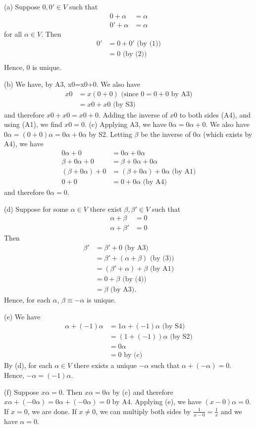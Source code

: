 \documentclass[12pt,letterpaper,reqno]{article}
\numberwithin{equation}{section}
\begin{document}
\begin{pf}
(a) Suppose $0,0' \in V$ such that 
\begin{align}
	0+\alpha &=\alpha \\
	0'+\alpha &=\alpha
\end{align}
for all $\alpha \in V$. Then 
\begin{align*}
	0'&=0+0' \text{ (by (1))} \\
	&=0 \text{ (by (2))} \\
\end{align*}
Hence, $0$ is unique. 

(b) We have, by A3, x0=x0+0. We also have
\begin{align*}
	x0&=x(0+0) \text{ (since $0=0+0$ by A3)} \\
	&=x0+x0 \text{ (by S3)}
\end{align*} and therefore $x0+x0=x0+0$. Adding the inverse of $x0$ to both sides (A4), and using (A1), we find $x0=0$.	
(c) Applying A3, we have $0\alpha=0\alpha+0$. We also have
$0\alpha =(0+0)\alpha=0\alpha + 0\alpha$ by S2. Letting $\beta$ be the inverse of $0\alpha$ (which exists by A4), we have
\begin{align*}
	0\alpha+0&=0\alpha+0\alpha \\
	\beta+0\alpha+0&=\beta+0\alpha+0\alpha \\
	(\beta+0\alpha)+0&=(\beta+0\alpha)+0\alpha \text{ (by A1)}\\
	0+0&=0+0\alpha \text{ (by A4)}
\end{align*} and therefore $0\alpha=0$. 

(d) Suppose for some $\alpha \in V$ there exist $\beta,\beta' \in V$ such that
\begin{align}
	\alpha+\beta &=0 \\
	\alpha+\beta' &=0
\end{align} Then
\begin{align*}
	\beta'&=\beta'+0 \text{ (by A3)}\\
	&=\beta'+(\alpha+\beta) \text{ (by (3))} \\
	&=(\beta'+\alpha)+\beta \text{ (by A1)} \\
	&=0+\beta \text{ (by (4))} \\
	&=\beta \text{ (by A3).}
\end{align*} Hence, for each $\alpha$, $\beta\equiv -\alpha$ is unique.

(e) We have
	\begin{align*}
		\alpha+(-1)\alpha &=1\alpha+(-1)\alpha \text{ (by S4)}\\
		&=(1+(-1))\alpha \text{ (by S2)}\\
		&=0\alpha \\
		&=0 \text{ by (c)}
	\end{align*}
By (d), for each $\alpha \in V$ there exists a unique $-\alpha$ such that $\alpha+(-\alpha)=0$. Hence, $-\alpha=(-1)\alpha$.

(f) Suppose $x\alpha=0$. Then $x\alpha=0\alpha$ by (c) and therefore $x\alpha+(-0\alpha)=0\alpha+(-0\alpha)=0$ by A4. Applying (e), we have $(x-0)\alpha=0$. If $x=0$, we are done. If $x \neq 0$, we can multiply both sides by $\frac{1}{x-0}=\frac{1}{x}$ and we have $\alpha=0$.
\end{pf}
\end{document}
